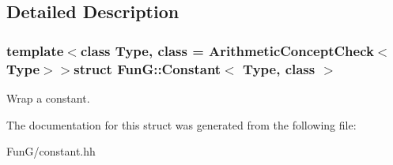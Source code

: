 \subsection{Detailed Description}
\subsubsection*{template$<$class Type, class = Arithmetic\-Concept\-Check$<$\-Type$>$$>$struct Fun\-G\-::\-Constant$<$ Type, class $>$}

Wrap a constant. 

The documentation for this struct was generated from the following file\-:\begin{DoxyCompactItemize}
\item 
Fun\-G/constant.\-hh\end{DoxyCompactItemize}
